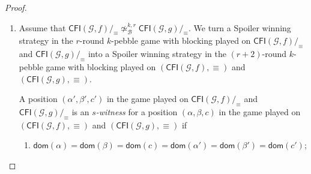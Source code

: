 \documentclass[10pt,a4paper]{article}
\newcommand{\defining}[1]{\emph{#1}}
\newcommand{\regular}{\mathsf{regular}}
\newcommand{\comp}{\equiv}
\newcommand{\CFIsym}{\mathsf{CFI}}
\newcommand{\CFI}[1]{\CFIsym(#1)}
\newcommand{\compCFI}[2]{\CFI{#1}/_{#2}}
\newcommand{\precompCFI}[2]{{(\CFI{#1},#2)}}
\newcommand{\graphG}{\mathcal{G}}
\newcommand{\dom}{\mathsf{dom}}
\newcommand{\notkbequivr}[2]{\not\simeq_{\mathcal{B}}^{#1,#2}}
\begin{document}
\begin{proof}
\begin{enumerate}
        Finally, we show that after a regular move
        the resulting position has an $(r-s-1)$-witness.
        Picking up a pebble pair from the precompressed CFI graphs
        is transferred to the compressed CFI graphs as  before.
        Now suppose Spoiler wants to place a pebble on the precompressed CFI graphs,
        say the $\ell$-th.
        Assume that Spoiler places the pebble on $\precompCFI{\graphG,f}{\comp}$
        (the case for $\precompCFI{\graphG,g}{\comp}$ is analogous).
        Let $u \in V_{\precompCFI{\graphG,f}{\comp}}$ be the vertex on which Spoiler places the pebble.
        Then in the game on the compressed CFI graphs $V_{\compCFI{\graphG,f}{\comp}}$ and $V_{\compCFI{\graphG,g}{\comp}}$,
        Spoiler places a pebble on $u/_\comp$.
        Assume that Duplicator answers with $v/_\comp$.
        Because we can assume that Duplicator plays color respecting,
        there is a unique vertex $w \in v/_\comp$ that has the same color as $u$.
        We let Duplicator respond with $w$ in the game on the the precompressed CFI graphs.
        Then the resulting position $(\alpha'[\ell \mapsto u],\beta'[\ell \mapsto w], c'[\ell\mapsto \regular])$,
        is an $(r-s-1)$-witness
        for the new position $(\alpha[\ell \mapsto u/_\comp],\beta[\ell \mapsto v/_\comp], c[\ell\mapsto \regular])$. 
        
        \item   
        Assume that $\compCFI{\graphG,f}{\comp} \notkbequivr{k}{r} \compCFI{\graphG,g}{\comp}$.
        We turn a Spoiler winning strategy in the $r$\nobreakdash-round  $k$\nobreakdash-pebble game with blocking played on $\compCFI{\graphG,f}{\comp}$ and $\compCFI{\graphG,g}{\comp}$
        into a Spoiler winning strategy in the $(r+2)$\nobreakdash-round 
        $k$\nobreakdash-pebble game with blocking played on $\precompCFI{\graphG,f}{\comp}$ and $\precompCFI{\graphG,g}{\comp}$.
        
        A position $(\alpha',\beta',c')$ in the game played on $\compCFI{\graphG,f}{\comp}$ and $\compCFI{\graphG,g}{\comp}$
        is an \defining{$s$-witness} for  a position
        $(\alpha,\beta,c)$ in the game played on $\precompCFI{\graphG,f}{\comp}$ and $\precompCFI{\graphG,g}{\comp}$ if
        \begin{enumerate}
        \makeatletter
        \renewcommand{\p@enumii}{}
        \renewcommand{\theenumii}{(\alph{enumii})}
\renewcommand{\labelenumii}{(\alph{enumii})}
        \setlength{\leftskip}{0.5em}
        \makeatother
                \item $\dom(\alpha) = \dom(\beta) =\dom(c) = \dom(\alpha') = \dom(\beta') = \dom(c')$;
        

\end{enumerate}
\end{enumerate}
\end{proof}
\end{document}
